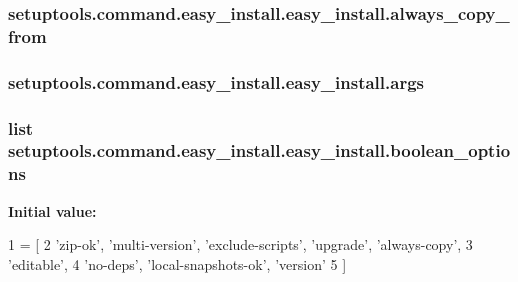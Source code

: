\subsubsection[{always\+\_\+copy\+\_\+from}]{\setlength{\rightskip}{0pt plus 5cm}setuptools.\+command.\+easy\+\_\+install.\+easy\+\_\+install.\+always\+\_\+copy\+\_\+from}\label{classsetuptools_1_1command_1_1easy__install_1_1easy__install_a48d4ae1820588aaa68b80249564a6126}
\hypertarget{classsetuptools_1_1command_1_1easy__install_1_1easy__install_a245326eef92af2fd2490071ec2fa271b}{}
\subsubsection[{args}]{\setlength{\rightskip}{0pt plus 5cm}setuptools.\+command.\+easy\+\_\+install.\+easy\+\_\+install.\+args}\label{classsetuptools_1_1command_1_1easy__install_1_1easy__install_a245326eef92af2fd2490071ec2fa271b}
\hypertarget{classsetuptools_1_1command_1_1easy__install_1_1easy__install_a088d7b675b927bb22a3678eb5f3d567e}{}
\subsubsection[{boolean\+\_\+options}]{\setlength{\rightskip}{0pt plus 5cm}list setuptools.\+command.\+easy\+\_\+install.\+easy\+\_\+install.\+boolean\+\_\+options\hspace{0.3cm}{\ttfamily [static]}}\label{classsetuptools_1_1command_1_1easy__install_1_1easy__install_a088d7b675b927bb22a3678eb5f3d567e}
{\bfseries Initial value\+:}
\begin{DoxyCode}
1 = [
2         \textcolor{stringliteral}{'zip-ok'}, \textcolor{stringliteral}{'multi-version'}, \textcolor{stringliteral}{'exclude-scripts'}, \textcolor{stringliteral}{'upgrade'}, \textcolor{stringliteral}{'always-copy'},
3         \textcolor{stringliteral}{'editable'},
4         \textcolor{stringliteral}{'no-deps'}, \textcolor{stringliteral}{'local-snapshots-ok'}, \textcolor{stringliteral}{'version'}
5     ]
\end{DoxyCode}
\hypertarget{classsetuptools_1_1command_1_1easy__install_1_1easy__install_addd15d5fea61ff7542f5330e1d5305c6}{}
